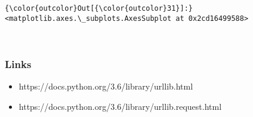\documentclass[11pt]{article}
\providecommand{\tightlist}{%
      \setlength{\itemsep}{0pt}\setlength{\parskip}{0pt}}
\begin{document}
\begin{Verbatim}[commandchars=\\\{\}]
{\color{outcolor}Out[{\color{outcolor}31}]:} <matplotlib.axes.\_subplots.AxesSubplot at 0x2cd16499588>
\end{Verbatim}
            
    \begin{center}
    \end{center}
    { \hspace*{\fill} \\}
    
    \subsubsection{Links}\label{links}

\begin{itemize}
\tightlist
\item
  https://docs.python.org/3.6/library/urllib.html
\item
  https://docs.python.org/3.6/library/urllib.request.html
\end{itemize}


    
    
    
    
\end{document}
